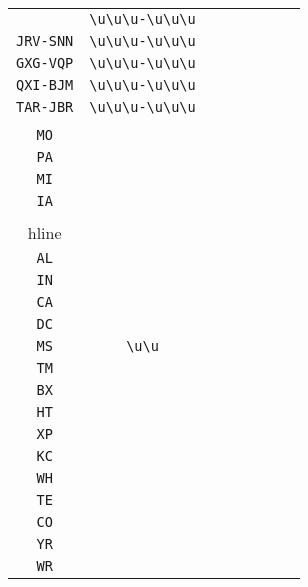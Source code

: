 \begin{longtable}{cccccccc}
\begin{tabular}{ll}
    \verb|JDM-RUS| & \verb|\u\u\u-\u\u\u|\\
\verb|JRV-SNN| & \verb|\u\u\u-\u\u\u|\\
\verb|GXG-VQP| & \verb|\u\u\u-\u\u\u|\\
\verb|QXI-BJM| & \verb|\u\u\u-\u\u\u|\\
\verb|TAR-JBR| & \verb|\u\u\u-\u\u\u|
\end{tabular}
\\\midrule 
\begin{tabular}{l}
    \verb|IL|\\
\verb|MO|\\
\verb|PA|\\
\verb|MI|\\
\verb|IA|\\
\\hline\\
\verb|AL|\\
\verb|IN|\\
\verb|CA|\\
\verb|DC|\\
\verb|MS|
\end{tabular}

&
\verb|\u\u|
&

\begin{tabular}{l}
    \verb|\u\u|\\
\verb|TM|\\
\verb|BX|\\
\verb|HT|\\
\verb|XP|\\
\verb|KC|
\end{tabular}

&

\begin{tabular}{l}
    \verb|\u\u|\\
\verb|WH|\\
\verb|TE|\\
\verb|CO|\\
\verb|YR|\\
\verb|WR|
\end{tabular}

&


\end{longtable}
